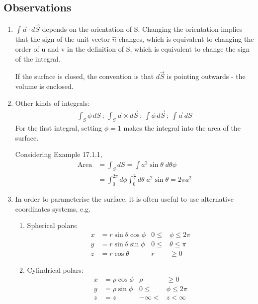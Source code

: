 \documentclass[a4paper, 11pt, normalem]{report}
\begin{document}
\subsection{Observations}
\begin{enumerate}
    \item $\int \vec{a} \cdot d\vec{S}$ depends on the orientation of S. Changing the orientation implies that the sign of the unit vector $\hat{n}$ changes, which is equivalent to changing the order of u and v in the definition of S, which is equivalent to change the sign of the integral.

    If the surface is closed, the convention is that $d\vec{S}$ is pointing outwards - the volume is enclosed.
    \item Other kinds of integrals:
            \begin{align*}
                \int_S \phi\,dS ~;~ \int_S \vec{a} \times d\vec{S} ~;~ \int \phi\,d\vec{S} ~;~ \int \vec{a}\,dS
            \end{align*}
            For the first integral, setting $\phi = 1$ makes the integral into the area of the surface.

            Considering Example 17.1.1,
            \begin{align*}
                \text{Area} &= \int_S dS = \int a^2 \sin\theta\; d\theta\phi \\
                &= \int_{0}^{2\pi} d\phi \int_{0}^{\frac{\pi}{2}} d\theta\; a^2\sin\theta = 2\pi a^2
            \end{align*}
    \item In order to parameterise the surface, it is often useful to use alternative coordinates systems, e.g.
            \begin{enumerate}
                \item Spherical polars:
                    \begin{align*}
                        x &= r\sin\theta\cos\phi & 0 \leq &\phi \leq 2\pi \\
                        y &= r\sin\theta\sin\phi & 0 \leq &\theta \leq \pi \\
                        z &= r\cos\theta & r &\geq 0
                    \end{align*}
                \item Cylindrical polars:
                    \begin{align*}
                        x &= \rho\cos\phi & \rho &\geq 0 \\
                        y &= \rho\sin\phi & 0 \leq &\phi \leq 2\pi \\
                        z &= z & -\infty < &z < \infty
                    \end{align*}
            \end{enumerate}
\end{enumerate}
\end{document}
